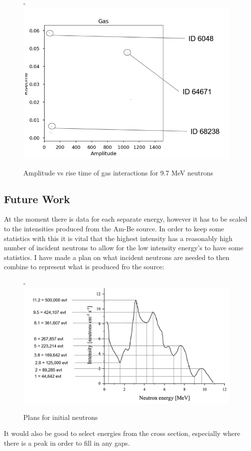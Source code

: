 \documentclass[a4paper]{article}
\begin{document}
\begin{figure}[H]-
        \centering
        \includegraphics[width=1\linewidth]{Fast/gas-id-6.PNG}
        \caption{Amplitude vs rise time of gas interactions for 9.7 MeV neutrons}
        \label{fig:south2d}
        \end{figure}
\subsection{Future Work}
At the moment there is data for each separate energy, however it has to be scaled to the intensities produced from the Am-Be source. In order to keep some statistics with this it is vital that the highest intensity has a reasonably high number of incident neutrons to allow for the low intensity energy's to have some statistics. I have made a plan on what incident neutrons are needed to then combine to represent what is produced fro the source:
\begin{figure}[H]-
        \centering
        \includegraphics[width=1\linewidth]{Fast/init.PNG}
        \caption{Plans for initial neutrons}
        \label{fig:south2d}
        \end{figure}
\noindent It would also be good to select energies from the cross section, especially where there is a peak in order to fill in any gaps.
\end{document}
